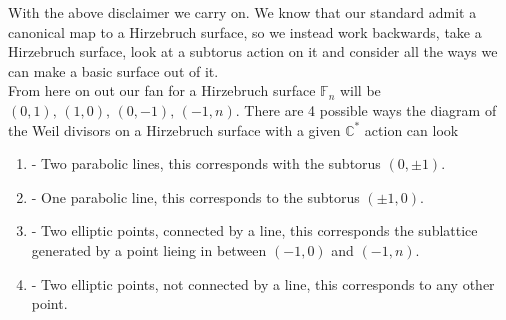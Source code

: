 \documentclass[11pt]{amsart}
\theoremstyle{plain}
\begin{document}
With the above disclaimer we carry on. We know that our standard admit a canonical map to a Hirzebruch surface, so we instead work backwards, take a Hirzebruch surface, look at a subtorus action on it and consider all the ways we can make a basic surface out of it.
\\
From here on out our fan for a Hirzebruch surface $\mathbb{F}_n$ will be $(0,1), \, (1,0), \, (0,-1), \, (-1, n)$. There are 4 possible ways the diagram of the Weil divisors on a Hirzebruch surface with a given $\mathbb{C}^*$ action can look
\begin{enumerate}[label =\Alph*]
\item - Two parabolic lines, this corresponds with the subtorus $(0, \pm 1)$.
\item - One parabolic line, this corresponds to the subtorus $(\pm 1, 0)$.
\item - Two elliptic points, connected by a line, this corresponds the sublattice generated by a point lieing in between $(-1,0)$ and $(-1, n)$.
\item - Two elliptic points, not connected by a line, this corresponds to any other point.
\end{enumerate} 

\begin{comment}
\begin{figure}[htbp]
\psset{unit=0.8cm}
\begin{pspicture}(0,-6)(18,0)
\psframe[linecolor=white](0.5,-6)(19,-1.5)

\psline[linecolor = blue]{-}(0.5, -4)(3.5, -4)
\psline{-}(1, -4.5)(1, -1.5)
\psline{-}(3, -4.5)(3, -1.5)
\psline[linecolor = blue]{-}(0.5, -2)(3.5, -2)

\psline{-}(5, -4)(8, -4)
\psline{-}(5.5, -4.5)(5.5, -1.5)
\psline[linecolor = blue]{-}(7.5, -4.5)(7.5, -1.5)
\psline{-}(5, -2)(8, -2)
\pscircle[fillcolor = red, fillstyle = solid](5.5, -2){0.15}


\psline{-}(9.5, -4)(12.5, -4)
\psline{-}(10, -4.5)(10, -1.5)
\psline{-}(12, -4.5)(12, -1.5)
\psline{-}(9.5, -2)(12.5, -2)
\pscircle[fillcolor = red, fillstyle = solid](10, -2){0.15}
\pscircle[fillcolor = red, fillstyle = solid](12, -2){0.15}

\psline{-}(14, -4)(17, -4)
\psline{-}(14.5, -4.5)(14.5, -1.5)
\psline{-}(16.5, -4.5)(16.5, -1.5)
\psline{-}(14, -2)(17, -2)
\pscircle[fillcolor = red, fillstyle = solid](14.5, -2){0.15}
\pscircle[fillcolor = red, fillstyle = solid](16.5, -4){0.15}

\end{pspicture}
\caption{The possible fibers in the theorem.}
\end{figure}
\end{comment}
\end{document}
